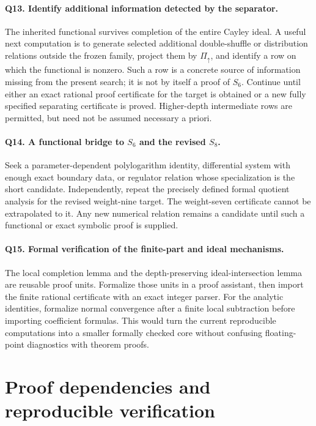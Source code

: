 \documentclass[11pt,a4paper]{article}
\numberwithin{equation}{section}
\theoremstyle{definition}
\theoremstyle{remark}
\begin{document}
\paragraph{Q13. Identify additional information detected by the separator.}
The inherited functional survives completion of the entire Cayley
ideal. A useful next computation is to generate selected additional
double-shuffle or distribution relations outside the frozen family,
project them by $\Pi_\uparrow$, and identify a row on which the
functional is nonzero. Such a row is a concrete source of information
missing from the present search; it is not by itself a proof of $S_6$.
Continue until either an exact rational proof certificate for the
target is obtained or a new fully specified separating certificate is
proved. Higher-depth intermediate rows are permitted, but need not be
assumed necessary a priori.

\paragraph{Q14. A functional bridge to $S_6$ and the revised $S_8$.}
Seek a parameter-dependent polylogarithm identity, differential system
with enough exact boundary data, or regulator relation whose
specialization is the short candidate. Independently, repeat the
precisely defined formal quotient analysis for the revised weight-nine
target. The weight-seven certificate cannot be extrapolated to it.
Any new numerical relation remains a candidate until such a functional
or exact symbolic proof is supplied.

\paragraph{Q15. Formal verification of the finite-part and ideal mechanisms.}
The local completion lemma and the depth-preserving ideal-intersection
lemma are reusable proof units. Formalize those units in a proof
assistant, then import the finite rational certificate with an exact
integer parser. For the analytic identities, formalize normal
convergence after a finite local subtraction before importing
coefficient formulas. This would turn the current reproducible
computations into a smaller formally checked core without confusing
floating-point diagnostics with theorem proofs.



\section{Proof dependencies and reproducible verification}
\label{verification:section}
\end{document}
